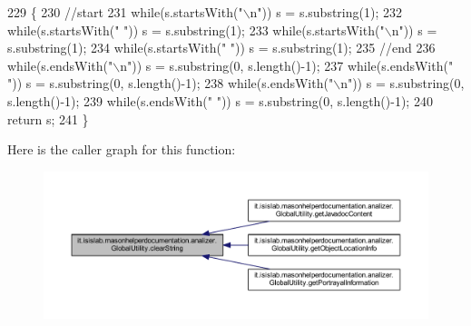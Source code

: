 \begin{DoxyCode}
229                                               \{
230         \textcolor{comment}{//start}
231         \textcolor{keywordflow}{while}(s.startsWith(\textcolor{stringliteral}{"\(\backslash\)n"}))   s = s.substring(1);
232         \textcolor{keywordflow}{while}(s.startsWith(\textcolor{stringliteral}{" "}))    s = s.substring(1);
233         \textcolor{keywordflow}{while}(s.startsWith(\textcolor{stringliteral}{"\(\backslash\)n"}))   s = s.substring(1);
234         \textcolor{keywordflow}{while}(s.startsWith(\textcolor{stringliteral}{" "}))    s = s.substring(1);
235         \textcolor{comment}{//end}
236         \textcolor{keywordflow}{while}(s.endsWith(\textcolor{stringliteral}{"\(\backslash\)n"})) s = s.substring(0, s.length()-1);
237         \textcolor{keywordflow}{while}(s.endsWith(\textcolor{stringliteral}{" "}))  s = s.substring(0, s.length()-1);
238         \textcolor{keywordflow}{while}(s.endsWith(\textcolor{stringliteral}{"\(\backslash\)n"})) s = s.substring(0, s.length()-1);
239         \textcolor{keywordflow}{while}(s.endsWith(\textcolor{stringliteral}{" "}))  s = s.substring(0, s.length()-1);
240         \textcolor{keywordflow}{return} s;
241     \}
\end{DoxyCode}


Here is the caller graph for this function\-:\nopagebreak
\begin{figure}[H]
\begin{center}
\leavevmode
\includegraphics[width=350pt]{classit_1_1isislab_1_1masonhelperdocumentation_1_1analizer_1_1_global_utility_aa713a96b1680738784bd341d3ffd1e00_icgraph}
\end{center}
\end{figure}


